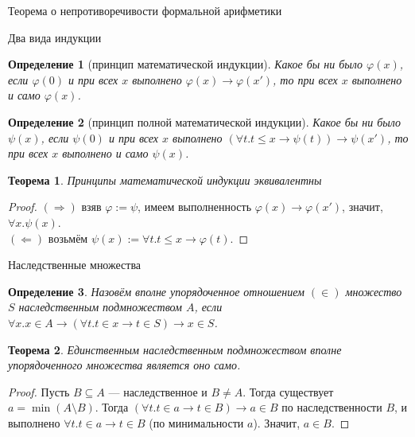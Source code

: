 \documentclass[handout]{beamer}
\newtheorem{thm}{Теорема}[section]
\newtheorem{dfn}{Определение}[section]
\begin{document}
\newcommand\doubleplus{+\kern-1.3ex+\kern0.8ex}
\newcommand\mdoubleplus{\ensuremath{\mathbin{+\mkern-10mu+}}}

\begin{frame}{}
\LARGE\begin{center}Теорема о непротиворечивости формальной арифметики\end{center}
\end{frame}

\begin{frame}{Два вида индукции}
\begin{dfn}[принцип математической индукции]
Какое бы ни было $\varphi(x)$, если $\varphi(0)$ и при всех $x$ выполнено $\varphi(x)\rightarrow \varphi(x')$, то
при всех $x$ выполнено и само $\varphi(x)$.
\end{dfn}

\begin{dfn}[принцип полной математической индукции]
Какое бы ни было $\psi(x)$, если $\psi(0)$ и при всех $x$ выполнено $(\forall t.t \leq x \rightarrow \psi(t))\rightarrow \psi(x')$, то
при всех $x$ выполнено и само $\psi(x)$.
\end{dfn}

\begin{thm}Принципы математической индукции эквивалентны\end{thm}
\begin{proof}
$(\Rightarrow)$ взяв $\varphi := \psi$, имеем выполненность $\varphi(x)\rightarrow\varphi(x')$, значит, $\forall x.\psi(x)$. \pause\\
$(\Leftarrow)$ возьмём $\psi(x) := \forall t.t\le x\rightarrow\varphi(t)$.
\end{proof}
\end{frame}

\begin{frame}{Наследственные множества}
\begin{dfn} Назовём вполне упорядоченное отношением $(\in)$ множество $S$ наследственным подмножеством $A$, если 
$\forall x.x \in A \rightarrow (\forall t.t \in x \rightarrow t \in S) \rightarrow x \in S$.
\end{dfn}
\begin{thm}Единственным наследственным подмножеством вполне упорядоченного множества является оно само.\end{thm}
\begin{proof}Пусть $B \subseteq A$ --- наследственное и $B \ne A$.
Тогда существует $a = \min (A \setminus B)$. Тогда $(\forall t.t \in a \rightarrow t \in B) \rightarrow a \in B$ по наследственности $B$,
и выполнено $\forall t.t \in a \rightarrow t \in B$ (по минимальности $a$). Значит, $a \in B$.
\end{proof}
\end{frame}
\end{document}
